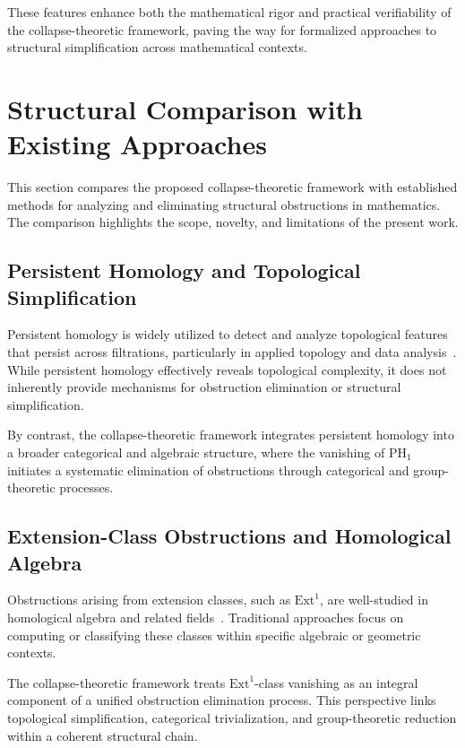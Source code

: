 \documentclass[11pt]{article}
\begin{document}
These features enhance both the mathematical rigor and practical verifiability of the collapse-theoretic framework, paving the way for formalized approaches to structural simplification across mathematical contexts.



\section{Structural Comparison with Existing Approaches}

This section compares the proposed collapse-theoretic framework with established methods for analyzing and eliminating structural obstructions in mathematics. The comparison highlights the scope, novelty, and limitations of the present work.

\subsection{Persistent Homology and Topological Simplification}

Persistent homology is widely utilized to detect and analyze topological features that persist across filtrations, particularly in applied topology and data analysis~\cite{Edelsbrunner2008}. While persistent homology effectively reveals topological complexity, it does not inherently provide mechanisms for obstruction elimination or structural simplification.

By contrast, the collapse-theoretic framework integrates persistent homology into a broader categorical and algebraic structure, where the vanishing of $\mathrm{PH}_1$ initiates a systematic elimination of obstructions through categorical and group-theoretic processes.

\subsection{Extension-Class Obstructions and Homological Algebra}

Obstructions arising from extension classes, such as $\mathrm{Ext}^1$, are well-studied in homological algebra and related fields~\cite{Weibel1994}. Traditional approaches focus on computing or classifying these classes within specific algebraic or geometric contexts.

The collapse-theoretic framework treats $\mathrm{Ext}^1$-class vanishing as an integral component of a unified obstruction elimination process. This perspective links topological simplification, categorical trivialization, and group-theoretic reduction within a coherent structural chain.
\end{document}
